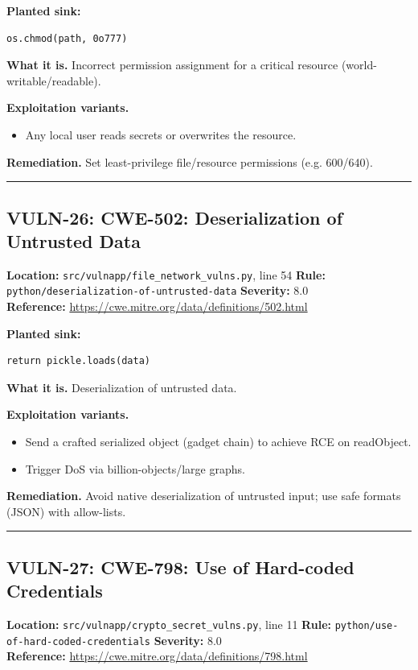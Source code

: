 \documentclass[11pt,a4paper]{article}
\begin{document}
\noindent\textbf{Planted sink:}
\begin{lstlisting}
os.chmod(path, 0o777)
\end{lstlisting}
\noindent\textbf{What it is.} Incorrect permission assignment for a critical resource (world-writable/readable).

\noindent\textbf{Exploitation variants.}
\begin{itemize}[leftmargin=1.4em,itemsep=1pt,topsep=2pt]
\item Any local user reads secrets or overwrites the resource.
\end{itemize}
\noindent\textbf{Remediation.} Set least-privilege file/resource permissions (e.g. 600/640).

\vspace{4pt}\hrule\vspace{6pt}
\subsection{VULN-26: CWE-502: Deserialization of Untrusted Data}
\noindent\textbf{Location:} \texttt{src/vulnapp/file\_network\_vulns.py}, line 54 \quad \textbf{Rule:} \texttt{python/deserialization-of-untrusted-data} \quad \textbf{Severity:} 8.0
\\ \textbf{Reference:} \url{https://cwe.mitre.org/data/definitions/502.html}

\noindent\textbf{Planted sink:}
\begin{lstlisting}
return pickle.loads(data)
\end{lstlisting}
\noindent\textbf{What it is.} Deserialization of untrusted data.

\noindent\textbf{Exploitation variants.}
\begin{itemize}[leftmargin=1.4em,itemsep=1pt,topsep=2pt]
\item Send a crafted serialized object (gadget chain) to achieve RCE on readObject.
\item Trigger DoS via billion-objects/large graphs.
\end{itemize}
\noindent\textbf{Remediation.} Avoid native deserialization of untrusted input; use safe formats (JSON) with allow-lists.

\vspace{4pt}\hrule\vspace{6pt}
\subsection{VULN-27: CWE-798: Use of Hard-coded Credentials}
\noindent\textbf{Location:} \texttt{src/vulnapp/crypto\_secret\_vulns.py}, line 11 \quad \textbf{Rule:} \texttt{python/use-of-hard-coded-credentials} \quad \textbf{Severity:} 8.0
\\ \textbf{Reference:} \url{https://cwe.mitre.org/data/definitions/798.html}
\end{document}
